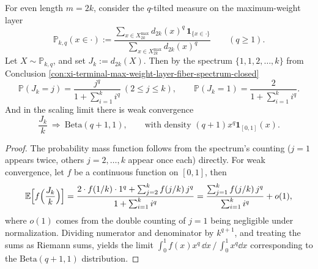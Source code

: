 \begin{conclusion}\label{con:xi-terminal-max-weight-escort-beta-limit}
For even length \(m=2k\), consider the \(q\)-tilted measure on the maximum-weight layer
\[
\mathbb{P}_{k,q}(x\in\cdot):=\frac{\sum_{x\in X_{2k}^{\max}} d_{2k}(x)^{q}\,\mathbf 1_{\{x\in\cdot\}}}{\sum_{x\in X_{2k}^{\max}} d_{2k}(x)^{q}}
\qquad(q\ge 1).
\]
Let \(X\sim\mathbb{P}_{k,q}\), and set \(J_k:=d_{2k}(X)\).
Then by the spectrum \(\{1,1,2,\dots,k\}\) from Conclusion \ref{con:xi-terminal-max-weight-layer-fiber-spectrum-closed}
\[
\mathbb{P}(J_k=j)=\frac{j^{q}}{1+\sum_{i=1}^{k} i^{q}}\ (2\le j\le k),\qquad
\mathbb{P}(J_k=1)=\frac{2}{1+\sum_{i=1}^{k} i^{q}}.
\]
And in the scaling limit there is weak convergence
\[
\frac{J_k}{k}\ \Rightarrow\ \mathrm{Beta}(q+1,1),
\qquad \text{with density }(q+1)x^{q}\mathbf 1_{[0,1]}(x).
\]
\end{conclusion}
\begin{proof}
The probability mass function follows from the spectrum's counting (\(j=1\) appears twice, others \(j=2,\dots,k\) appear once each) directly.
For weak convergence, let \(f\) be a continuous function on \([0,1]\), then
\[
\mathbb{E}\Bigl[f\Bigl(\frac{J_k}{k}\Bigr)\Bigr]
=\frac{2\cdot f(1/k)\cdot 1^{q}+\sum_{j=2}^{k} f(j/k)\,j^{q}}{1+\sum_{i=1}^{k} i^{q}}
=\frac{\sum_{j=1}^{k} f(j/k)\,j^{q}}{\sum_{i=1}^{k} i^{q}}+o(1),
\]
where \(o(1)\) comes from the double counting of \(j=1\) being negligible under normalization.
Dividing numerator and denominator by \(k^{q+1}\), and treating the sums as Riemann sums, yields the limit
\(
\int_{0}^{1}f(x)x^{q}\,\dd x\,/\,\int_0^1 x^{q}\dd x
\)
corresponding to the \(\mathrm{Beta}(q+1,1)\) distribution.
\end{proof}

